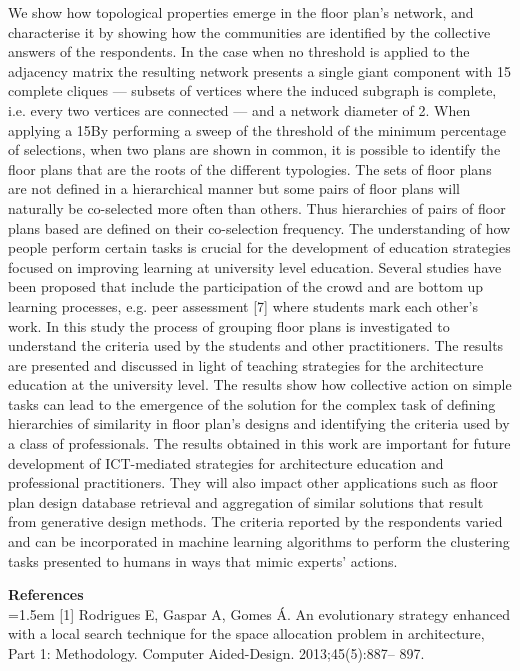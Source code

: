 \documentclass[]{scrartcl}
\begin{document}
We show how topological properties emerge in the floor plan’s network, and characterise it by showing how the communities are identified by the collective answers of the respondents. In the case when no threshold is applied to the adjacency matrix the resulting network presents a single giant component with 15 complete cliques — subsets of vertices where the induced subgraph is complete, i.e. every two vertices are connected — and a network diameter of 2. When applying a 15By performing a sweep of the threshold of the minimum percentage of selections, when two plans are shown in common, it is possible to identify the floor plans that are the roots of the different typologies. The sets of floor plans are not defined in a hierarchical manner but some pairs of floor plans will naturally be co-selected more often than others. Thus hierarchies of pairs of floor plans based are defined on their co-selection frequency. 
The understanding of how people perform certain tasks is crucial for the development of education strategies focused on improving learning at university level education. Several studies have been proposed that include the participation of the crowd and are bottom up learning processes, e.g. peer assessment [7] where students mark each other’s work. In this study the process of grouping floor plans is investigated to understand the criteria used by the students and other practitioners. The results are presented and discussed in light of teaching strategies for the architecture education at the university level. The results show how collective action on simple tasks can lead to the emergence of the solution for the complex task of defining hierarchies of similarity in floor plan’s designs and identifying the criteria used by a class of professionals.
The results obtained in this work are important for future development of ICT-mediated strategies for architecture education and professional practitioners. They will also impact other applications such as floor plan design database retrieval and aggregation of similar solutions that result from generative design methods. The criteria reported by the respondents varied and can be incorporated in machine learning algorithms to perform the clustering tasks presented to humans in ways that mimic experts’ actions. 

\vfill

\noindent\textbf{References} \\

\noindent\hangindent=1.5em
[1] Rodrigues E, Gaspar A, Gomes Á. An evolutionary strategy enhanced with a local search technique for the space allocation problem in architecture, Part 1: Methodology. Computer Aided-Design. 2013;45(5):887-- 897.
\end{document}
